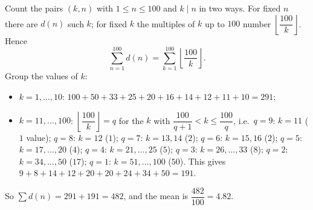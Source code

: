 Count the pairs $(k,n)$ with $1\le n\le100$ and $k\mid n$ in two ways. For fixed $n$ there are $d(n)$ such $k$; for fixed $k$ the multiples of $k$ up to $100$ number $\left\lfloor\dfrac{100}{k}\right\rfloor$. Hence
\[
\sum_{n=1}^{100}d(n)=\sum_{k=1}^{100}\left\lfloor\dfrac{100}{k}\right\rfloor .
\]
Group the values of $k$:
\begin{itemize}
\item $k=1,\dots,10$: $100+50+33+25+20+16+14+12+11+10=291$;
\item $k=11,\dots,100$: $\left\lfloor\dfrac{100}{k}\right\rfloor=q$ for the $k$ with $\dfrac{100}{q+1}<k\le\dfrac{100}{q}$, i.e.\ $q=9$: $k=11$ ($1$ value); $q=8$: $k=12$ ($1$); $q=7$: $k=13,14$ ($2$); $q=6$: $k=15,16$ ($2$); $q=5$: $k=17,\dots,20$ ($4$); $q=4$: $k=21,\dots,25$ ($5$); $q=3$: $k=26,\dots,33$ ($8$); $q=2$: $k=34,\dots,50$ ($17$); $q=1$: $k=51,\dots,100$ ($50$). This gives $9+8+14+12+20+20+24+34+50=191$.
\end{itemize}
So $\sum d(n)=291+191=482$, and the mean is $\dfrac{482}{100}=\boxed{4.82}$.
